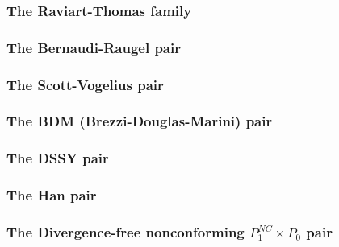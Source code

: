 \subsubsection{The Raviart-Thomas family} \label{ss:raviart_thomas}


\subsubsection{The Bernaudi-Raugel pair} \label{ss:bernaudi_raugel}


\subsubsection{The Scott-Vogelius pair} \label{ss:scott_vogelius}


\subsubsection{The BDM (Brezzi-Douglas-Marini) pair} \label{ss:bdm}


\subsubsection{The DSSY pair} \label{ss:pair_dssy2D}


\subsubsection{The Han pair} \label{ss:han}



\subsubsection{The Divergence-free nonconforming $P_1^{NC}\times P_0$ pair} \label{ss:p1ncp0}


